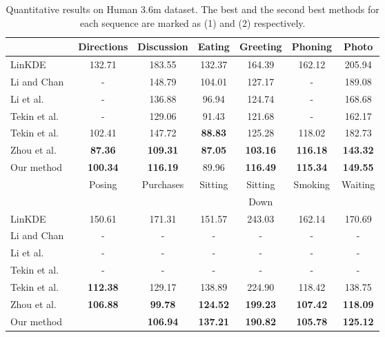 \documentclass[runningheads]{llncs}
\begin{document}
\begin{table}[t]
\centering
\caption{Quantitative results on Human 3.6m dataset. The best and the second best methods for each sequence are marked as (1) and (2) respectively.}
\label{tab1}
\begin{tabular}{ l c c c c c c }
  \hline
  \quad & Directions & Discussion & Eating & Greeting & Phoning & Photo \\ \hline
  LinKDE~\cite{h36m_pami}\quad & 132.71 & 183.55 & 132.37 & 164.39 & 162.12 & 205.94 \\
  Li and Chan~\cite{li20143d}\quad & - & 148.79 & 104.01 & 127.17 & - & 189.08 \\
  Li et al.~\cite{li2015maximum}\quad & - & 136.88 & 96.94 & 124.74 & - & 168.68 \\
  Tekin et al.~\cite{tekin2016structured}\quad & - & 129.06 & 91.43 & 121.68 & - & 162.17 \\
  Tekin et al.~\cite{Tekin_2016_CVPR}\quad & 102.41 & 147.72 & \bf 88.83 & 125.28 & 118.02 & 182.73 \\
  Zhou et al.~\cite{Zhou_2016_CVPR}\quad & \bf 87.36 & \bf 109.31 & \bf 87.05 & \bf 103.16 & \bf 116.18 & \bf 143.32 \\
  Our method\quad & \bf 100.34 & \bf 116.19 & 89.96 & \bf 116.49 & \bf 115.34 & \bf 149.55 \\ \hline

  \multirow{2}{*}{\quad} & \multirow{2}{*}{Posing} & \multirow{2}{*}{Purchases} & \multirow{2}{*}{Sitting} & Sitting & \multirow{2}{*}{Smoking} & \multirow{2}{*}{Waiting} \\
  & & & & Down & & \\ \hline
  LinKDE~\cite{h36m_pami}\quad & 150.61 & 171.31 & 151.57 & 243.03 & 162.14 & 170.69 \\
  Li and Chan~\cite{li20143d}\quad & - & - & - & - & - & - \\
  Li et al.~\cite{li2015maximum}\quad & - & - & - & - & - & - \\
  Tekin et al.~\cite{tekin2016structured}\quad & - & - & - & - & - & - \\
  Tekin et al.~\cite{Tekin_2016_CVPR}\quad & \bf 112.38 & 129.17 & 138.89 & 224.90 & 118.42 & 138.75 \\
  Zhou et al.~\cite{Zhou_2016_CVPR}\quad & \bf 106.88 & \bf 99.78 & \bf 124.52 & \bf 199.23 & \bf 107.42 & \bf 118.09 \\
  Our method\quad & \quad117.57 & \bf 106.94 & \bf 137.21 & \bf 190.82 & \bf 105.78 & \bf 125.12 \\ \hline


\end{tabular}
\end{table}
\end{document}
